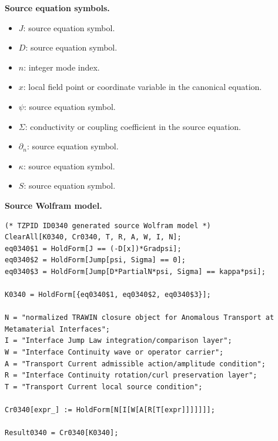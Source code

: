 \begin{minipage}[t]{0.49\linewidth}
\begingroup
\small
\raggedright
\textbf{Source equation symbols.}\par
\begin{itemize}[leftmargin=1.35em,itemsep=1pt,topsep=1pt,parsep=0pt]
    \item $J$: source equation symbol.
    \item $D$: source equation symbol.
    \item $n$: integer mode index.
    \item $x$: local field point or coordinate variable in the canonical equation.
    \item $\psi$: source equation symbol.
    \item $\Sigma$: conductivity or coupling coefficient in the source equation.
    \item $\partial_{n}$: source equation symbol.
    \item $\kappa$: source equation symbol.
    \item $S$: source equation symbol.
\end{itemize}
\endgroup
\end{minipage}\hfill
\begin{minipage}[t]{0.47\linewidth}
\begingroup
\scriptsize
\raggedright
\textbf{Source Wolfram model.}\par
\begin{Verbatim}[fontsize=\tiny,breaklines=true,breakanywhere=true]
(* TZPID ID0340 generated source Wolfram model *)
ClearAll[K0340, Cr0340, T, R, A, W, I, N];
eq0340$1 = HoldForm[J == (-D[x])*Gradpsi];
eq0340$2 = HoldForm[Jump[psi, Sigma] == 0];
eq0340$3 = HoldForm[Jump[D*PartialN*psi, Sigma] == kappa*psi];

K0340 = HoldForm[{eq0340$1, eq0340$2, eq0340$3}];

N = "normalized TRAWIN closure object for Anomalous Transport at Metamaterial Interfaces";
I = "Interface Jump Law integration/comparison layer";
W = "Interface Continuity wave or operator carrier";
A = "Transport Current admissible action/amplitude condition";
R = "Interface Continuity rotation/curl preservation layer";
T = "Transport Current local source condition";

Cr0340[expr_] := HoldForm[N[I[W[A[R[T[expr]]]]]]];

Result0340 = Cr0340[K0340];
\end{Verbatim}
\endgroup
\end{minipage}

